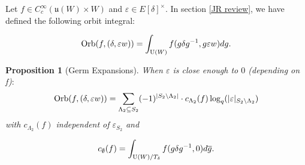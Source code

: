 \documentclass[11pt, oneside,reqno]{amsart}   	%
\newtheorem{proposition}[theorem]{Proposition}
\begin{document}
Let $f \in C_c^\infty (\mathfrak{u}(W) \times W)$ and $\varepsilon \in E[\delta]^\times$. In section \ref{JR review}, we have defined the following orbit integral: 

$$\textup{Orb}(f,(\delta, \varepsilon w)) = \int_{\textup{U}(W)}f(g\delta g^{-1},g\varepsilon w)dg.$$

\begin{proposition}[Germ Expansions]
When $\varepsilon$ is close enough to $0$ \textup{(}depending on f\textup{)}$:$
$$\textup{Orb}(f,(\delta, \varepsilon w))=\sum_{\Lambda_2 \subseteq S_2}(-1)^{|S_2 \backslash \Lambda_2|} \cdot c_{\Lambda_2}(f) \log_q(|{\varepsilon}|_{S_2 \backslash \Lambda_2})$$
with $c_{\Lambda_2}(f)$ independent of $\varepsilon_{S_2}$ and 
 
 $$c_\emptyset(f)=\int_{\textup{U}(W)/T_\delta}f(g\delta g^{-1},0)d\overline{g}.$$
 
\end{proposition}
\end{document}
